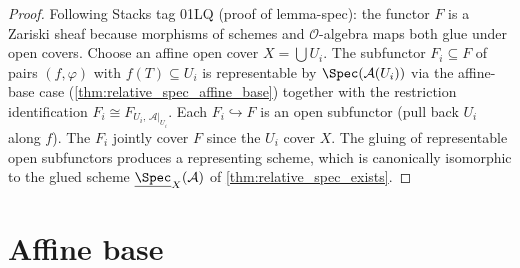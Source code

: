 \begin{proof}
  
  Following Stacks tag 01LQ (proof of lemma-spec): the functor \(F\) is a Zariski sheaf
  because morphisms of schemes and \(\mathcal{O}\)-algebra maps both glue under open covers.
  Choose an affine open cover \(X = \bigcup U_i\). The subfunctor
  \(F_i \subseteq F\) of pairs \((f, \varphi)\) with \(f(T) \subseteq U_i\) is representable by
  \(\Spec(\mathcal{A}(U_i))\) via the affine-base case
  (\cref{thm:relative_spec_affine_base}) together with the
  restriction identification \(F_i \cong F_{U_i,\,\mathcal{A}|_{U_i}}\).
  Each \(F_i \hookrightarrow F\) is an open
  subfunctor (pull back \(U_i\) along \(f\)). The \(F_i\) jointly cover \(F\) since the \(U_i\)
  cover \(X\). The gluing of representable open subfunctors produces a representing scheme,
  which is canonically isomorphic to the glued scheme \(\underline{\Spec}_X(\mathcal{A})\)
  of \cref{thm:relative_spec_exists}.
\end{proof}

\section{Affine base}
\label{sec:relspec_affine}

